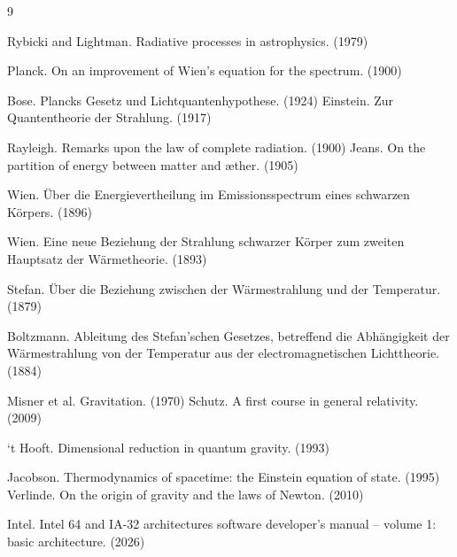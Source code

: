 \documentclass[10pt]{article}
\theoremstyle{definition}
\theoremstyle{remark}
\begin{document}
\begin{thebibliography}{9}


 Rybicki and Lightman. Radiative processes in astrophysics. (1979)


 Planck. On an improvement of Wien’s equation for the spectrum. (1900)

 Bose. Plancks Gesetz und Lichtquantenhypothese. (1924)
 Einstein. Zur Quantentheorie der Strahlung. (1917)


 Rayleigh. Remarks upon the law of complete radiation. (1900)
 Jeans. On the partition of energy between matter and \ae ther. (1905)

 Wien. \"Uber die Energievertheilung im Emissionsspectrum eines schwarzen K\"orpers. (1896)



 Wien. Eine neue Beziehung der Strahlung schwarzer K\"orper zum zweiten Hauptsatz der W\"armetheorie. (1893)



 Stefan. \"Uber die Beziehung zwischen der W\"armestrahlung und der Temperatur. (1879)


 Boltzmann. Ableitung des Stefan'schen Gesetzes, betreffend die Abh\"angigkeit der W\"armestrahlung von der Temperatur aus der electromagnetischen Lichttheorie. (1884)


 Misner et al. Gravitation. (1970)
 Schutz. A first course in general relativity. (2009)

 `t Hooft. Dimensional reduction in quantum gravity. (1993)

 Jacobson. Thermodynamics of spacetime: the Einstein equation of state. (1995)
 Verlinde. On the origin of gravity and the laws of Newton. (2010)

 Intel. Intel 64 and IA-32 architectures software developer’s manual -- volume 1: basic architecture. (2026)


\end{thebibliography}
\end{document}

